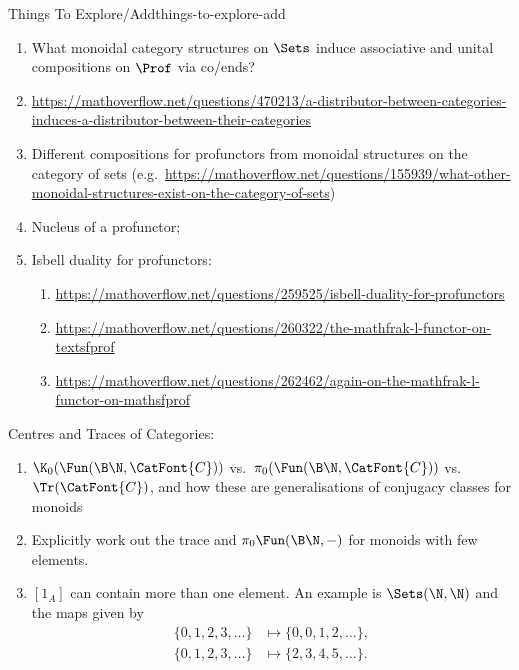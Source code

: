 \begin{remark}{Things To Explore/Add}{things-to-explore-add}
\begin{enumerate}
            However, if $\CatFont{V}$ is $*$-autonomous, then $\mathsf{Prof}_{\CatFont{V}}$ is a linear bicategory (Proposition 6.6 of \url{https://arxiv.org/abs/2209.05693}). In that case, there's probably a calculus of left/right Kan extensions/lifts one can develop. What is it?
        \item What monoidal category structures on $\Sets$ induce associative and unital compositions on $\Prof$ via co/ends?
        \item \url{https://mathoverflow.net/questions/470213/a-distributor-between-categories-induces-a-distributor-between-their-categories}
        \item Different compositions for profunctors from monoidal structures on the category of sets (e.g.\ \url{https://mathoverflow.net/questions/155939/what-other-monoidal-structures-exist-on-the-category-of-sets})
        \item Nucleus of a profunctor;
        \item Isbell duality for profunctors:
            \begin{enumerate}
                \item \url{https://mathoverflow.net/questions/259525/isbell-duality-for-profunctors}
                \item \url{https://mathoverflow.net/questions/260322/the-mathfrak-l-functor-on-textsfprof}
                \item \url{https://mathoverflow.net/questions/262462/again-on-the-mathfrak-l-functor-on-mathsfprof}
            \end{enumerate}
    \end{enumerate}
    Centres and Traces of Categories:
    \begin{enumerate}
        \item $\K_{0}(\Fun(\B\N,\CatFont{C}))$ vs.\ $\pi_{0}(\Fun(\B\N,\CatFont{C}))$ vs.\ $\Tr(\CatFont{C})$, and how these are generalisations of conjugacy classes for monoids
        \item Explicitly work out the trace and $\pi_{0}\Fun(\B\N,-)$ for monoids with few elements.
        \item $[1_{A}]$ can contain more than one element. An example is $\Sets(\N,\N)$ and the maps given by
            \begin{align*}
                \{0,1,2,3,\ldots\} &\mapsto \{0,0,1,2,\ldots\},\\
                \{0,1,2,3,\ldots\} &\mapsto \{2,3,4,5,\ldots\}.
            \end{align*}

\end{enumerate}
\end{remark}
